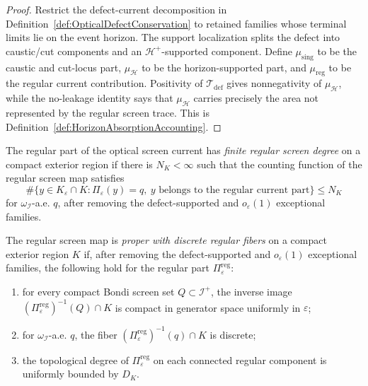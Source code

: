 \begin{proof}
Restrict the defect-current decomposition in Definition~\ref{def:OpticalDefectConservation} to retained families whose terminal limits lie on the event horizon. The support localization splits the defect into caustic/cut components and an $\mathcal H^+$-supported component. Define $\mu_{\mathrm{sing}}$ to be the caustic and cut-locus part, $\mu_{\mathcal H}$ to be the horizon-supported part, and $\mu_{\mathrm{reg}}$ to be the regular current contribution. Positivity of $\mathcal T_{\mathrm{def}}$ gives nonnegativity of $\mu_{\mathcal H}$, while the no-leakage identity says that $\mu_{\mathcal H}$ carries precisely the area not represented by the regular screen trace. This is Definition~\ref{def:HorizonAbsorptionAccounting}.
\end{proof}

\begin{definition}\label{def:FiniteRegularScreenDegree}
The regular part of the optical screen current has \emph{finite regular screen degree} on a compact exterior region if there is $N_K<\infty$ such that the counting function of the regular screen map satisfies
\[
    \#\{y\in K_\varepsilon\cap K:\Pi_\varepsilon(y)=q,\ y\text{ belongs to the regular current part}\}
    \le N_K
\]
for $\omega_{\mathscr I}$-a.e. $q$, after removing the defect-supported and $o_\varepsilon(1)$ exceptional families.
\end{definition}

\begin{definition}\label{def:ProperRegularScreenMap}
The regular screen map is \emph{proper with discrete regular fibers} on a compact exterior region $K$ if, after removing the defect-supported and $o_\varepsilon(1)$ exceptional families, the following hold for the regular part $\Pi_{\varepsilon}^{\mathrm{reg}}$:
\begin{enumerate}
    \item for every compact Bondi screen set $Q\subset\mathscr I^+$, the inverse image $(\Pi_{\varepsilon}^{\mathrm{reg}})^{-1}(Q)\cap K$ is compact in generator space uniformly in $\varepsilon$;
    \item for $\omega_{\mathscr I}$-a.e. $q$, the fiber $(\Pi_{\varepsilon}^{\mathrm{reg}})^{-1}(q)\cap K$ is discrete;
    \item the topological degree of $\Pi_{\varepsilon}^{\mathrm{reg}}$ on each connected regular component is uniformly bounded by $D_K$.
\end{enumerate}
\end{definition}

